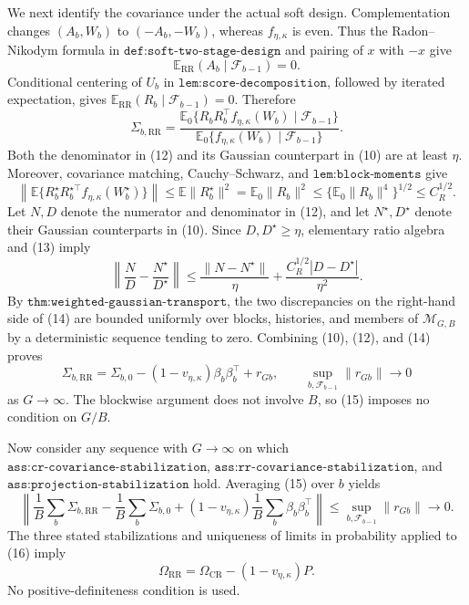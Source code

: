 We next identify the covariance under the actual soft design. Complementation changes \((A_b,W_b)\) to \((-A_b,-W_b)\), whereas \(f_{\eta,\kappa}\) is even. Thus the Radon--Nikodym formula in \(\texttt{def:soft-two-stage-design}\) and pairing of \(x\) with \(-x\) give
\[
\mathbb E_{\mathrm{RR}}(A_b\mid\mathcal F_{b-1})=0.                       \tag{11}
\]
Conditional centering of \(U_b\) in \(\texttt{lem:score-decomposition}\), followed by iterated expectation, gives \(\mathbb E_{\mathrm{RR}}(R_b\mid\mathcal F_{b-1})=0\). Therefore
\[
\Sigma_{b,\mathrm{RR}}
=\frac{\mathbb E_0\{R_bR_b^\top f_{\eta,\kappa}(W_b)
                         \mid\mathcal F_{b-1}\}}
        {\mathbb E_0\{f_{\eta,\kappa}(W_b)
                         \mid\mathcal F_{b-1}\}}.                           \tag{12}
\]
Both the denominator in (12) and its Gaussian counterpart in (10) are at least \(\eta\). Moreover, covariance matching, Cauchy--Schwarz, and \(\texttt{lem:block-moments}\) give
\[
\left\|\mathbb E\{R_b^\star R_b^{\star\top}
                         f_{\eta,\kappa}(W_b^\star)\}\right\|
\leq\mathbb E\|R_b^\star\|^2
=\mathbb E_0\|R_b\|^2
\leq\{\mathbb E_0\|R_b\|^4\}^{1/2}
\leq C_R^{1/2}.                                                            \tag{13}
\]
Let \(N,D\) denote the numerator and denominator in (12), and let \(N^\star,D^\star\) denote their Gaussian counterparts in (10). Since \(D,D^\star\geq\eta\), elementary ratio algebra and (13) imply
\[
\left\|\frac ND-\frac{N^\star}{D^\star}\right\|
\leq\frac{\|N-N^\star\|}{\eta}
    +\frac{C_R^{1/2}|D-D^\star|}{\eta^2}.                                \tag{14}
\]
By \(\texttt{thm:weighted-gaussian-transport}\), the two discrepancies on the right-hand side of (14) are bounded uniformly over blocks, histories, and members of \(\mathcal M_{G,B}\) by a deterministic sequence tending to zero. Combining (10), (12), and (14) proves
\[
\Sigma_{b,\mathrm{RR}}
=\Sigma_{b,0}-(1-v_{\eta,\kappa})\beta_b\beta_b^\top+r_{Gb},
\qquad
\sup_{b,\mathcal F_{b-1}}\|r_{Gb}\|\longrightarrow0                       \tag{15}
\]
as \(G\to\infty\). The blockwise argument does not involve \(B\), so (15) imposes no condition on \(G/B\).

Now consider any sequence with \(G\to\infty\) on which \(\texttt{ass:cr-covariance-stabilization}\), \(\texttt{ass:rr-covariance-stabilization}\), and \(\texttt{ass:projection-stabilization}\) hold. Averaging (15) over \(b\) yields
\[
\left\|\frac1B\sum_b\Sigma_{b,\mathrm{RR}}
-\frac1B\sum_b\Sigma_{b,0}
+(1-v_{\eta,\kappa})\frac1B\sum_b\beta_b\beta_b^\top\right\|
\leq\sup_{b,\mathcal F_{b-1}}\|r_{Gb}\|\longrightarrow0.                 \tag{16}
\]
The three stated stabilizations and uniqueness of limits in probability applied to (16) imply
\[
\Omega_{\mathrm{RR}}
=\Omega_{\mathrm{CR}}-(1-v_{\eta,\kappa})P.                               \tag{17}
\]
No positive-definiteness condition is used.


